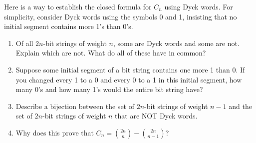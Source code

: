 \documentclass{book}
\begin{document}
\setcounter{project}{186}
\addtocounter{project}{-1}
\begin{activity}[]\label{activity-179}
\hypertarget{p-1070}{}%
Here is a way to establish the closed formula for \(C_n\) using Dyck words.  For simplicity, consider Dyck words using the symbols 0 and 1, insisting that no initial segment contains more 1's than 0's.%
\begin{enumerate}[font=\bfseries,label=(\alph*),ref=\alph*]
\item\label{task-200} \hypertarget{p-1071}{}%
Of all \(2n\)-bit strings of weight \(n\), some are Dyck words and some are not.  Explain which are not.  What do all of these have in common?%
\item\label{task-201} \hypertarget{p-1072}{}%
Suppose some initial segment of a bit string contains one more 1 than 0.  If you changed every 1 to a 0 and every 0 to a 1 in this initial segment, how many 0's and how many 1's would the entire bit string have?%
\item\label{task-202} \hypertarget{p-1073}{}%
Describe a bijection between the set of \(2n\)-bit strings of weight \(n-1\) and the set of \(2n\)-bit strings of weight \(n\) that are NOT Dyck words.%
\item\label{task-203} \hypertarget{p-1074}{}%
Why does this prove that \(C_n = \binom{2n}{n} - \binom{2n}{n-1}\)?%
\end{enumerate}
\end{activity}
\end{document}
